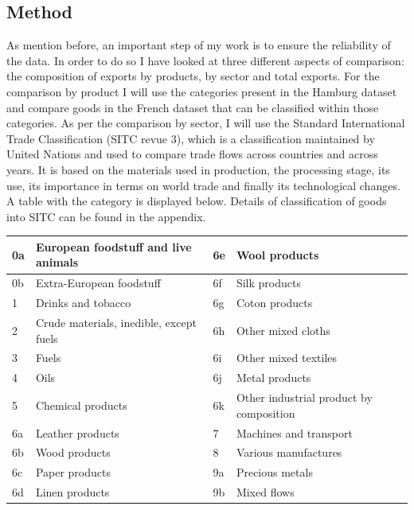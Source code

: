 \documentclass[12pt,a4paper,titlepage,english]{article}
\begin{document}
\subsection{Method}
As mention before, an important step of my work is to ensure the reliability of the data. In order to do so I have looked at three different aspects of comparison: the composition of exports by products, by sector and total exports. For the comparison by product I will use the categories present in the Hamburg dataset and compare goods in the French dataset that can be classified within those categories. As per the comparison by sector, I will use the Standard International Trade Classification (SITC revue 3), which is a classification maintained by United Nations and used to compare trade flows across countries and across years. It is based on the materials used in production, the processing stage, its use, its importance in terms on world trade and finally its technological changes.  A table with the category is displayed below. Details of classification of goods into SITC can be found in the appendix.

 \label{tab:title} 
\begin{center}
\begin{tabular}{ | l | l | l | l | }
\hline
	0a & European foodstuff and live animals & 6e & Wool products \\ \hline
	0b & Extra-European foodstuff & 6f & Silk products \\ \hline
	1 & Drinks and tobacco & 6g & Coton products \\ \hline
	2 & Crude materials, inedible, except fuels & 6h & Other mixed cloths \\ \hline
	3 & Fuels & 6i & Other mixed textiles \\ \hline
	4 & Oils & 6j & Metal products \\ \hline
	5 & Chemical products & 6k & Other industrial product by composition \\ \hline
	6a & Leather products & 7 & Machines and transport \\ \hline
	6b & Wood products & 8 & Various manufactures \\ \hline
	6c & Paper products & 9a & Precious metals \\ \hline
	6d & Linen products & 9b & Mixed flows \\ \hline
\end{tabular}\\~\\
\end{center}
\end{document}
